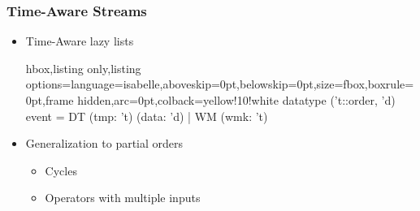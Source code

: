 \documentclass[aspectratio=169,10pt]{beamer}
\begin{document}
\begin{frame}[fragile]
  \frametitle{Time-Aware Streams}
  \begin{itemize}
    \item Time-Aware lazy lists
\vspace*{-1ex}
\begin{tcblisting}{hbox,listing only,listing options={language=isabelle,aboveskip=0pt,belowskip=0pt},size=fbox,boxrule=0pt,frame hidden,arc=0pt,colback=yellow!10!white}
datatype ('t::order, 'd) event = DT (tmp: 't) (data: 'd) | WM (wmk: 't)
\end{tcblisting}
\vspace*{-1ex}
          \pause
    \item Generalization to partial orders
          \begin{itemize}
            \item Cycles
            \item Operators with multiple inputs
          \end{itemize}
    \end{itemize}
\end{frame}
\end{document}
